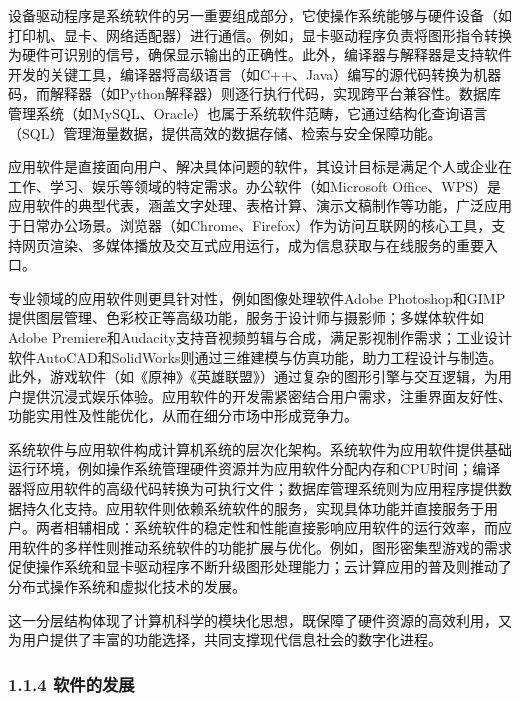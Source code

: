 设备驱动程序是系统软件的另一重要组成部分，它使操作系统能够与硬件设备（如打印机、显卡、网络适配器）进行通信。例如，显卡驱动程序负责将图形指令转换为硬件可识别的信号，确保显示输出的正确性。此外，编译器与解释器是支持软件开发的关键工具，编译器将高级语言（如C++、Java）编写的源代码转换为机器码，而解释器（如Python解释器）则逐行执行代码，实现跨平台兼容性。数据库管理系统（如MySQL、Oracle）也属于系统软件范畴，它通过结构化查询语言（SQL）管理海量数据，提供高效的数据存储、检索与安全保障功能。


应用软件是直接面向用户、解决具体问题的软件，其设计目标是满足个人或企业在工作、学习、娱乐等领域的特定需求。办公软件（如Microsoft Office、WPS）是应用软件的典型代表，涵盖文字处理、表格计算、演示文稿制作等功能，广泛应用于日常办公场景。浏览器（如Chrome、Firefox）作为访问互联网的核心工具，支持网页渲染、多媒体播放及交互式应用运行，成为信息获取与在线服务的重要入口。

专业领域的应用软件则更具针对性，例如图像处理软件Adobe Photoshop和GIMP提供图层管理、色彩校正等高级功能，服务于设计师与摄影师；多媒体软件如Adobe Premiere和Audacity支持音视频剪辑与合成，满足影视制作需求；工业设计软件AutoCAD和SolidWorks则通过三维建模与仿真功能，助力工程设计与制造。此外，游戏软件（如《原神》《英雄联盟》）通过复杂的图形引擎与交互逻辑，为用户提供沉浸式娱乐体验。应用软件的开发需紧密结合用户需求，注重界面友好性、功能实用性及性能优化，从而在细分市场中形成竞争力。


系统软件与应用软件构成计算机系统的层次化架构。系统软件为应用软件提供基础运行环境，例如操作系统管理硬件资源并为应用软件分配内存和CPU时间；编译器将应用软件的高级代码转换为可执行文件；数据库管理系统则为应用程序提供数据持久化支持。应用软件则依赖系统软件的服务，实现具体功能并直接服务于用户。两者相辅相成：系统软件的稳定性和性能直接影响应用软件的运行效率，而应用软件的多样性则推动系统软件的功能扩展与优化。例如，图形密集型游戏的需求促使操作系统和显卡驱动程序不断升级图形处理能力；云计算应用的普及则推动了分布式操作系统和虚拟化技术的发展。

这一分层结构体现了计算机科学的模块化思想，既保障了硬件资源的高效利用，又为用户提供了丰富的功能选择，共同支撑现代信息社会的数字化进程。

\hypertarget{ux8f6fux4ef6ux7684ux53d1ux5c55}{%
\subsubsection{1.1.4 软件的发展}\label{ux8f6fux4ef6ux7684ux53d1ux5c55}}

